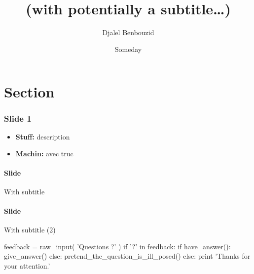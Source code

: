 \documentclass[compress,xcolor=dvipsnames]{beamer}
\begin{document}
\title{\selectfont{The title of the talk}\\\medskip
    \large\textcolor{beautyblue}{
    \textbf{(with potentially a subtitle\ldots)}} \medskip}
\author[{Djalel Benbouzid}]{\textcolor{grizoo}{Djalel Benbouzid}}
\date[someday\ldots]{Someday}%

\begin{frame}
\titlepage
\end{frame}

\section{Section}

\begin{frame}[c]
\frametitle{Slide 1}
\begin{itemize}
    \item \textbf{Stuff:} description 
    \item \textbf{Machin:} avec truc 
\end{itemize}
\end{frame}

\begin{frame}[c]
\framesubtitle{Slide}{With subtitle}
\end{frame}

\begin{frame}[c]
\framesubtitle[1cm]{Slide}{With subtitle (2)}
\end{frame}


\appendix
{}
\setcounter{finalframe}{\value{framenumber}}

\begin{frame} %
\begin{python}
feedback = raw_input( 'Questions ?' )
if '?' in feedback:
    if have_answer():
        give_answer()
    else:
        pretend_the_question_is_ill_posed()
else:
    print 'Thanks for your attention.'
\end{python}

\end{frame}

%         
%         

\setcounter{framenumber}{\value{finalframe}}
\end{document}
